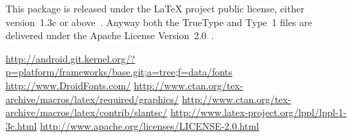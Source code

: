\documentclass{article}
\begin{document}
This package is released under the \LaTeX{} project public license, either
version~1.3c or above~\cite{lppl}. Anyway both the TrueType and Type~1 files are
delivered under the Apache License Version~2.0~\cite{asl}.

\begin{thebibliography}{9}
  \url{http://android.git.kernel.org/?p=platform/frameworks/base.git;a=tree;f=data/fonts}
 \url{http://www.DroidFonts.com/}
  \url{http://www.ctan.org/tex-archive/macros/latex/required/graphics/}
  \url{http://www.ctan.org/tex-archive/macros/latex/contrib/slantsc/}
 \url{http://www.latex-project.org/lppl/lppl-1-3c.html}
 \url{http://www.apache.org/licenses/LICENSE-2.0.html}
\end{thebibliography}
\end{document}
